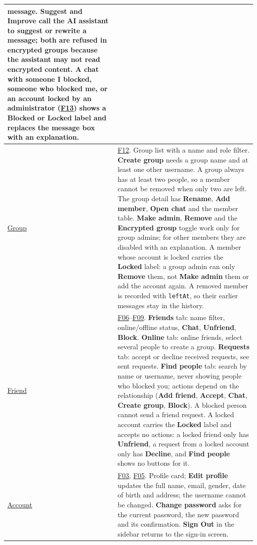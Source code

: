 \begin{longtable}{|L{4.3cm}|L{\dimexpr\textwidth-4.3cm-4\arrayrulewidth\relax}|}
  message. \textbf{Suggest} and \textbf{Improve} call the AI assistant to suggest or
  rewrite a message; both are refused in encrypted groups because the assistant may
  not read encrypted content. A chat with someone I blocked, someone who blocked me,
  or an account locked by an administrator (\hyperlink{F13}{F13}) shows a
  \textbf{Blocked} or \textbf{Locked} label and replaces the message box with an
  explanation.\\
  \hline
  \href{https://www.figma.com/design/maCogjZs9eOOhfkxsOZoIU?node-id=129-931}{Group}
  & \hyperlink{F12}{F12}. Group list with a name and role filter.
  \textbf{Create group} needs a group name and at least one other username.
  A group always has at least two people, so a member cannot be removed when only two
  are left. The group detail has \textbf{Rename}, \textbf{Add member},
  \textbf{Open chat} and the member table. \textbf{Make admin}, \textbf{Remove} and the
  \textbf{Encrypted group} toggle work only for group admins; for other members they
  are disabled with an explanation. A member whose account is locked carries the
  \textbf{Locked} label: a group admin can only \textbf{Remove} them, not
  \textbf{Make admin} them or add the account again. A removed member is recorded with
  \texttt{leftAt}, so their earlier messages stay in the history.\\
  \hline
  \href{https://www.figma.com/design/maCogjZs9eOOhfkxsOZoIU?node-id=129-932}{Friend}
  & \hyperlink{F06}{F06}--\hyperlink{F09}{F09}. \textbf{Friends} tab: name filter,
  online/offline status, \textbf{Chat}, \textbf{Unfriend}, \textbf{Block}.
  \textbf{Online} tab: online friends, select several people to create a group.
  \textbf{Requests} tab: accept or decline received requests, see sent requests.
  \textbf{Find people} tab: search by name or username, never showing people who
  blocked you; actions depend on the relationship (\textbf{Add friend},
  \textbf{Accept}, \textbf{Chat}, \textbf{Create group}, \textbf{Block}). A blocked
  person cannot send a friend request. A locked account carries the \textbf{Locked}
  label and accepts no actions: a locked friend only has \textbf{Unfriend}, a request
  from a locked account only has \textbf{Decline}, and \textbf{Find people} shows no
  buttons for it.\\
  \hline
  \href{https://www.figma.com/design/maCogjZs9eOOhfkxsOZoIU?node-id=129-933}{Account}
  & \hyperlink{F03}{F03}, \hyperlink{F05}{F05}. Profile card; \textbf{Edit profile}
  updates the full name, email, gender, date of birth and address; the username cannot
  be changed. \textbf{Change password} asks for the current password, the new password
  and its confirmation. \textbf{Sign Out} in the sidebar returns to the sign-in
  screen.\\
  \hline
\end{longtable}
\endgroup

